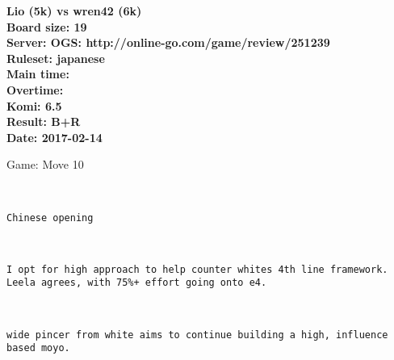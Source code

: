\documentclass{article}
\begin{document}
\begin{titlepage}
    \null
    \vfill
    \begin{center}
        \textbf{Lio (5k) vs wren42 (6k)}\\
        \textbf{Board size: 19}\\
        \textbf{Server: OGS: http://online-go.com/game/review/251239}\\
        \textbf{Ruleset: japanese}\\
        \textbf{Main time: }\\
        \textbf{Overtime: }\\
        \textbf{Komi: 6.5}\\
        \textbf{Result: B+R}\\
        \textbf{Date: 2017-02-14}
    \end{center}
    \vfill
\end{titlepage}
\newpage
\tableofcontents
\newpage
\begin{section}{Game: Move 10}
\begin{center}
\cleargoban
{}
\showfullgoban
\\\begin{lstlisting}
Chinese opening
\end{lstlisting}
\end{center}
\begin{center}
\cleargoban
{}
\showfullgoban
\\\begin{lstlisting}
I opt for high approach to help counter whites 4th line framework.  Leela agrees, with 75%+ effort going onto e4. 
\end{lstlisting}
\end{center}
\begin{center}
\cleargoban
{}
\showfullgoban
\\\begin{lstlisting}
wide pincer from white aims to continue building a high, influence based moyo. 
\end{lstlisting}
\end{center}
\end{section}
\end{document}
